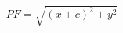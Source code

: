 \documentclass[preview]{standalone}
\begin{document}
\begin{align*}
PF = \sqrt{(x+c)^2+y^2}
\end{align*}
\end{document}
